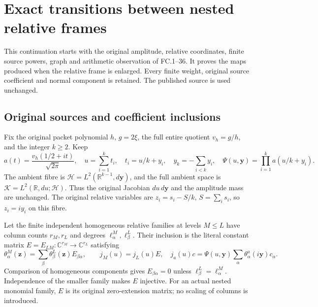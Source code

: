 \section{Exact transitions between nested relative frames}
\label{sec:nested-relative-frame-transition}
This continuation starts with the original amplitude, relative coordinates,
finite source powers, graph and arithmetic observation of FC.1--36.
It proves the maps produced when the relative frame is enlarged.
Every finite weight, original source coefficient and normal component
is retained. The published source is used unchanged.

\subsection{Original sources and coefficient inclusions}

Fix the original packet polynomial $h$, $g=2\xi$, the full entire
quotient $v_h=g/h$, and the integer $k\ge2$. Keep
\[
 a(t)=\frac{v_h(1/2+it)}{\sqrt{2\pi}},\quad
 u=\sum_{i=1}^k t_i,\quad t_i=u/k+y_i,\quad
 y_k=-\sum_{i<k}y_i,\quad
 \Psi(u,\mathbf y)=\prod_{i=1}^k a(u/k+y_i).
 \tag{NT.1}
\]
The ambient fibre is $\mathscr H=L^2(\mathbb R^{k-1},d\mathbf y)$,
and the full ambient space is
$\mathscr K=L^2(\mathbb R,du;\mathscr H)$.
Thus the original Jacobian $du\,d\mathbf y$ and the amplitude mass
are unchanged. The original relative variables are
$z_i=s_i-S/k$, $S=\sum_i s_i$, so $z_i=iy_i$ on this fibre.

Let the finite independent homogeneous relative families at levels
$M\le L$ have column counts $r_M,r_L$ and degrees
$\ell^{M}_{\alpha},\ell^{L}_{\beta}$. Their inclusion is the literal
constant matrix $E=E_{LM}:\mathbb C^{r_M}\to\mathbb C^{r_L}$ satisfying
\[
 \theta^M_\alpha(\mathbf z)
  =\sum_\beta\theta^L_\beta(\mathbf z)E_{\beta\alpha},\qquad
 j_M(u)=j_L(u)E,
 \quad j_a(u)c=\Psi(u,\mathbf y)
                    \sum_\alpha\theta^a_\alpha(i\mathbf y)c_\alpha.
 \tag{NT.2}
\]
Comparison of homogeneous components gives
$E_{\beta\alpha}=0$ unless
$\ell^L_\beta=\ell^M_\alpha$. Independence of the smaller
family makes $E$ injective. For an actual nested monomial family,
$E$ is its original zero-extension matrix; no scaling of columns
is introduced.

